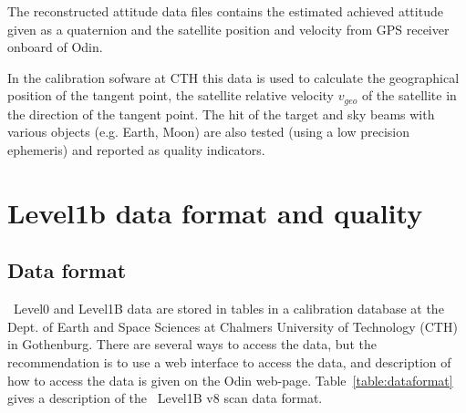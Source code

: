 The reconstructed attitude data files contains the estimated
achieved attitude given as a quaternion and the satellite position   
and velocity from GPS receiver onboard of Odin.

In the calibration sofware at CTH this data is used to calculate
the geographical position of the tangent point, the satellite relative velocity 
\(v_{geo}\) of the satellite in the direction of the tangent point.
The hit of the target and sky beams with various objects (e.g. Earth, Moon) 
are also tested (using a low precision ephemeris)
and reported as quality indicators.


\chapter{Level1b data format and quality}



\section{Data format}

\smr\ Level0 and Level1B data are stored in tables
in a calibration database at the Dept. of Earth and Space
Sciences at Chalmers University of Technology (CTH) in Gothenburg.
There are several ways to access the data, but the recommendation is to use a web 
interface to access the data, and description of how to access the data
is given on the Odin web-page. Table~\ref{table:dataformat} gives a description 
of the \smr\ Level1B v8 scan data format.

